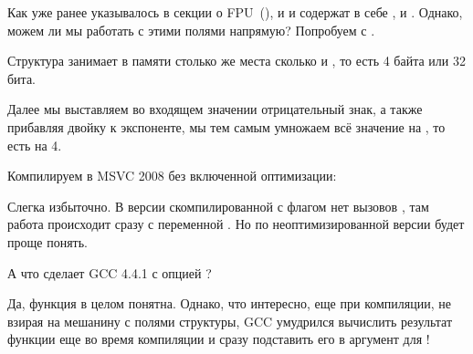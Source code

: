 \subsectionold{\WorkingWithFloatAsWithStructSubSubSectionName}
\label{sec:floatasstruct}

Как уже ранее указывалось в секции о FPU~(), 
и \Tfloat и \Tdouble содержат в себе ,  и . 
Однако, можем ли мы работать с этими полями напрямую? Попробуем с \Tfloat.





Структура  занимает в памяти столько же места сколько и \Tfloat, 
то есть 4 байта или 32 бита.

Далее мы выставляем во входящем значении отрицательный знак, 
а также прибавляя двойку к экспоненте, мы тем 
самым умножаем всё значение на , то есть на 4.

Компилируем в MSVC 2008 без включенной оптимизации:



Слегка избыточно. В версии скомпилированной с флагом \Ox нет вызовов , 
там работа происходит сразу с переменной . Но по неоптимизированной версии будет проще понять.

А что сделает GCC 4.4.1 с опцией \Othree?



Да, функция \ttf в целом понятна. Однако, что интересно, еще при компиляции, 
не взирая на мешанину с полями структуры, GCC умудрился вычислить результат функции  еще
во время компиляции и сразу подставить его в аргумент для \printf{}!

